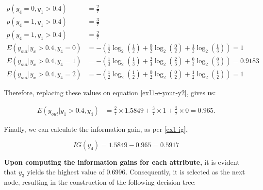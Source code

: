 \documentclass[12pt]{article}
\begin{document}
\begin{enumerate}[leftmargin=\labelsep]
    \[
        \begin{aligned}
            p(y_4 = 0, y_1 > 0.4)          & = \frac{2}{7}                                                                                     \\
            p(y_4 = 1, y_1 > 0.4)          & = \frac{3}{7}                                                                                     \\
            p(y_4 = 1, y_1 > 0.4)          & = \frac{2}{7}                                                                                     \\
            E(y_{out} | y_x > 0.4 , y_4 = 0) & = - \left(\frac{1}{2} \log_2\left(\frac{1}{2}\right) + \frac{0}{2} \log_2\left(\frac{0}{2}\right)
                + \frac{1}{2} \log_2\left(\frac{1}{3}\right)\right) = 1                                                                   \\
            E(y_{out} | y_x > 0.4 , y_4 = 1) & = - \left(\frac{1}{3} \log_2\left(\frac{1}{3}\right) + \frac{2}{3} \log_2\left(\frac{2}{3}\right)
                + \frac{0}{3} \log_2\left(\frac{0}{3}\right)\right) = 0.9183                                                                       \\
            E(y_{out} | y_x > 0.4 , y_4 = 2) & = - \left(\frac{1}{2} \log_2\left(\frac{1}{2}\right) + \frac{0}{2} \log_2\left(\frac{0}{2}\right)
                + \frac{1}{2} \log_2\left(\frac{1}{2}\right)\right) = 1
        \end{aligned}
    \]

    Therefore, replacing these values on equation \eqref{exI1-e-yout-y2}, gives us:

    \[
        \begin{aligned}
            E(y_{out} | y_1>0.4, y_4) & = \frac{2}{7} \times 1.5849 + \frac{3}{7} \times 1 +  \frac{2}{7} \times 0 = 0.965.
        \end{aligned}
    \]

    Finally, we can calculate the information gain, as per \eqref{ex1-ig},

    \[
        IG(y_{4}) = 1.5849 - 0.965 = 0.5917
    \]


    \textbf{Upon computing the information gains for each attribute,} it is evident that $y_3$ yields the highest value of 0.6996. Consequently,
        it is selected as the next node, resulting in the construction of the following decision tree:


\end{enumerate}
\end{document}
